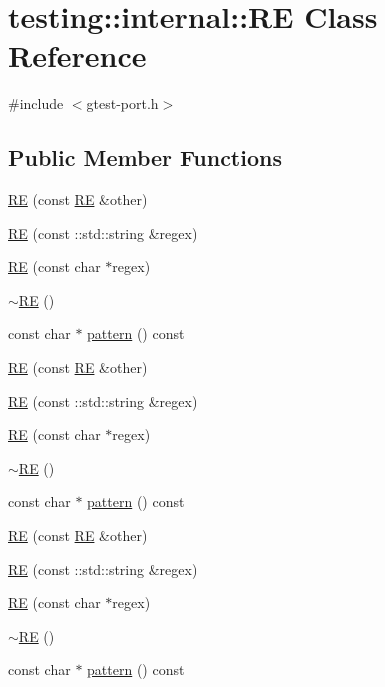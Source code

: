 \hypertarget{classtesting_1_1internal_1_1_r_e}{}\section{testing\+::internal\+::RE Class Reference}
\label{classtesting_1_1internal_1_1_r_e}


{\ttfamily \#include $<$gtest-\/port.\+h$>$}

\subsection*{Public Member Functions}
\begin{DoxyCompactItemize}
\item 
\mbox{\hyperlink{classtesting_1_1internal_1_1_r_e_ab215dbc2565fce641e1746ca43e9d68a}{RE}} (const \mbox{\hyperlink{classtesting_1_1internal_1_1_r_e}{RE}} \&other)
\item 
\mbox{\hyperlink{classtesting_1_1internal_1_1_r_e_a8840bd639642f3d4769a94a68ce463c2}{RE}} (const \+::std\+::string \&regex)
\item 
\mbox{\hyperlink{classtesting_1_1internal_1_1_r_e_a908ea936a5b7a14479a1b292a7189ca6}{RE}} (const char $\ast$regex)
\item 
\mbox{\hyperlink{classtesting_1_1internal_1_1_r_e_af3ad18e6c0b433f3d85ed23eda8119f3}{$\sim$\+RE}} ()
\item 
const char $\ast$ \mbox{\hyperlink{classtesting_1_1internal_1_1_r_e_a24236aab3a6b0183a145a6f4c0bb9848}{pattern}} () const
\item 
\mbox{\hyperlink{classtesting_1_1internal_1_1_r_e_ab215dbc2565fce641e1746ca43e9d68a}{RE}} (const \mbox{\hyperlink{classtesting_1_1internal_1_1_r_e}{RE}} \&other)
\item 
\mbox{\hyperlink{classtesting_1_1internal_1_1_r_e_a8840bd639642f3d4769a94a68ce463c2}{RE}} (const \+::std\+::string \&regex)
\item 
\mbox{\hyperlink{classtesting_1_1internal_1_1_r_e_a908ea936a5b7a14479a1b292a7189ca6}{RE}} (const char $\ast$regex)
\item 
\mbox{\hyperlink{classtesting_1_1internal_1_1_r_e_af3ad18e6c0b433f3d85ed23eda8119f3}{$\sim$\+RE}} ()
\item 
const char $\ast$ \mbox{\hyperlink{classtesting_1_1internal_1_1_r_e_a24236aab3a6b0183a145a6f4c0bb9848}{pattern}} () const
\item 
\mbox{\hyperlink{classtesting_1_1internal_1_1_r_e_ab215dbc2565fce641e1746ca43e9d68a}{RE}} (const \mbox{\hyperlink{classtesting_1_1internal_1_1_r_e}{RE}} \&other)
\item 
\mbox{\hyperlink{classtesting_1_1internal_1_1_r_e_a8840bd639642f3d4769a94a68ce463c2}{RE}} (const \+::std\+::string \&regex)
\item 
\mbox{\hyperlink{classtesting_1_1internal_1_1_r_e_a908ea936a5b7a14479a1b292a7189ca6}{RE}} (const char $\ast$regex)
\item 
\mbox{\hyperlink{classtesting_1_1internal_1_1_r_e_af3ad18e6c0b433f3d85ed23eda8119f3}{$\sim$\+RE}} ()
\item 
const char $\ast$ \mbox{\hyperlink{classtesting_1_1internal_1_1_r_e_a24236aab3a6b0183a145a6f4c0bb9848}{pattern}} () const
\end{DoxyCompactItemize}

